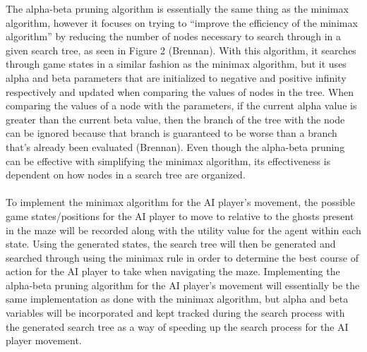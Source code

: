 \documentclass[letterpaper]{article} %
\begin{document}
The alpha-beta pruning algorithm is essentially the same thing as the minimax algorithm, however it focuses on trying to “improve the efficiency of the minimax algorithm” by reducing the number of nodes necessary to search through in a given search tree, as seen in Figure 2 (Brennan). With this algorithm, it searches through game states in a similar fashion as the minimax algorithm, but it uses alpha and beta parameters that are initialized to negative and positive infinity respectively and updated when comparing the values of nodes in the tree. When comparing the values of a node with the parameters, if the current alpha value is greater than the current beta value, then the branch of the tree with the node can be ignored because that branch is guaranteed to be worse than a branch that’s already been evaluated (Brennan). Even though the alpha-beta pruning can be effective with simplifying the minimax algorithm, its effectiveness is dependent on how nodes in a search tree are organized.
\\ \\
To implement the minimax algorithm for the AI player’s movement, the possible game states/positions for the AI player to move to relative to the ghosts present in the maze will be recorded along with the utility value for the agent within each state. Using the generated states, the search tree will then be generated and searched through using the minimax rule in order to determine the best course of action for the AI player to take when navigating the maze. Implementing the alpha-beta pruning algorithm for the AI player’s movement will essentially be the same implementation as done with the minimax algorithm, but alpha and beta variables will be incorporated and kept tracked during the search process with the generated search tree as a way of speeding up the search process for the AI player movement.
\end{document}
